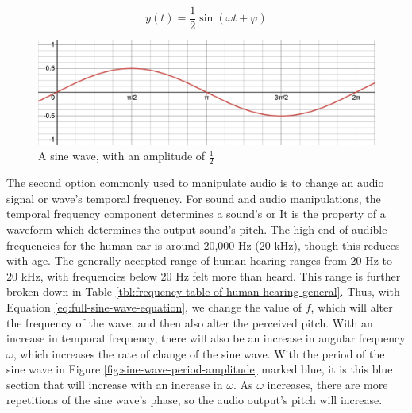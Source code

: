 \begin{equation}\label{eq:half-sized-sine-wave}
	y(t) = \frac{1}{2} \sin(\omega t + \varphi)
\end{equation}

\begin{figure}
	\centering
	\includegraphics[width=\textwidth]{figures/half-sized-sine-wave.png}
	\caption{A sine wave, with an amplitude of $\frac{1}{2}$}
	\label{fig:half-sized-sine-wave}
\end{figure}

The second option commonly used to manipulate audio is to change an audio signal or wave's temporal frequency. For sound and audio manipulations, the temporal frequency component determines a sound's  or  It is the property of a waveform which determines the output sound's pitch. The high-end of audible frequencies for the human ear is around 20,000 Hz (20 kHz), though this reduces with age. The generally accepted range of human hearing ranges from 20 Hz to 20 kHz, with frequencies below 20 Hz felt more than heard\cite{Rosen_Howell_2011}. This range is further broken down in Table \ref{tbl:frequency-table-of-human-hearing-general}. Thus, with Equation \ref{eq:full-sine-wave-equation}, we change the value of $f$, which will alter the frequency of the wave, and then also alter the perceived pitch. With an increase in temporal frequency, there will also be an increase in angular frequency $\omega$, which increases the rate of change of the sine wave. With the period of the sine wave in Figure \ref{fig:sine-wave-period-amplitude} marked blue, it is this blue section that will increase with an increase in $\omega$. As $\omega$ increases, there are more repetitions of the sine wave's phase, so the audio output's pitch will increase.


